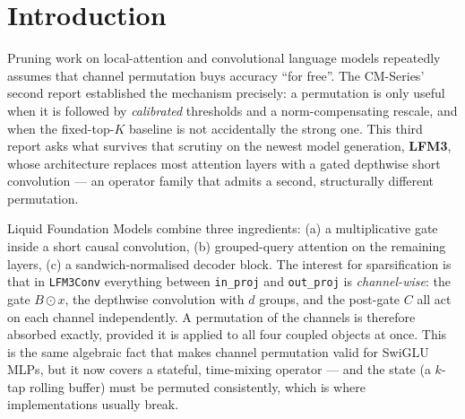 \documentclass[11pt]{article}
\newcommand{\code}[1]{\texttt{\small #1}}
\begin{document}
\begin{abstract}
(3.31$\times$) CPU decode, with a 3.15$\times$ block-sparse GEMV measured on the RTX 5070.
(iv)~\emph{Video token skipping}: the five-stage $P_2$ pipeline removes 55.5--59.5\% of
multimodal prefill tokens on static/local-motion/illumination clips for 1.75--1.84$\times$
prefill speedup with $\mathrm{KL}\le10^{-6}$, top-1 agreement 1.00 and unchanged VQA
accuracy, while the $\hat s>0.5$ and global-motion flush rules make scene cuts and camera
pans \emph{bit-identical} to dense execution ($\max|\Delta| = 0.0$).
\emph{Attribution}: the decision rule dominates block ordering --- roughly $8\times$ versus
$2\times$ on the FFN, and \code{LFM3Conv} gating is lossless once $\alpha{=}1$ --- and norm
compensation $\alpha$ is annihilated by the sandwich RMSNorm, so we report the ordering's
much smaller share explicitly rather than attribute the gain to $\pi$. A second measured
negative result: the standard asymmetric \code{IQ4\_NL} codebook reconstructs these weights
3--7$\times$ worse than a symmetric 16-level table at the same 18 bytes per 32 weights.
\end{abstract}

\section{Introduction}

Pruning work on local-attention and convolutional language models repeatedly assumes
that channel permutation buys accuracy ``for free''. The CM-Series' second report
established the mechanism precisely: a permutation is only useful when it is followed by
\emph{calibrated} thresholds and a norm-compensating rescale, and when the fixed-top-$K$
baseline is not accidentally the strong one. This third report asks what survives that
scrutiny on the newest model generation, \textbf{LFM3}, whose architecture replaces most
attention layers with a gated depthwise short convolution --- an operator family that
admits a second, structurally different permutation.

Liquid Foundation Models combine three ingredients: (a) a multiplicative gate inside a
short causal convolution, (b) grouped-query attention on the remaining layers, (c) a
sandwich-normalised decoder block. The interest for sparsification is that in
\code{LFM3Conv} everything between \code{in\_proj} and \code{out\_proj} is
\emph{channel-wise}: the gate $B\odot x$, the depthwise convolution with $d$ groups, and
the post-gate $C$ all act on each channel independently. A permutation of the channels is
therefore absorbed exactly, provided it is applied to all four coupled objects at once.
This is the same algebraic fact that makes channel permutation valid for SwiGLU MLPs, but
it now covers a stateful, time-mixing operator --- and the state (a $k$-tap rolling
buffer) must be permuted consistently, which is where implementations usually break.
\end{document}
